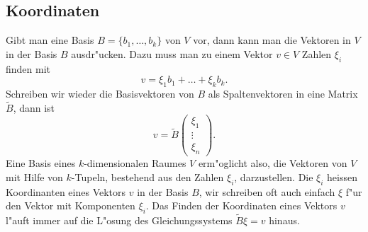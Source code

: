 \subsection{Koordinaten}
Gibt man eine Basis $B=\{b_1,\dots,b_k\}$ von $V$ vor,
dann kann man die Vektoren
in $V$ in der Basis $B$ ausdr"ucken. Dazu muss man zu einem 
Vektor $v\in V$ Zahlen $\xi_i$ finden mit
\[
v=\xi_1 b_1+\dots +\xi_k b_k.
\]
Schreiben wir wieder die Basisvektoren von $B$ als Spaltenvektoren in 
eine Matrix $\tilde B$, dann ist 
\[
v=\tilde B\begin{pmatrix}\xi_1\\\vdots\\\xi_n\end{pmatrix}.
\]
Eine Basis eines $k$-dimensionalen Raumes $V$ erm"oglicht also,
die Vektoren von $V$ mit Hilfe von $k$-Tupeln, bestehend
aus den Zahlen $\xi_i$, darzustellen. Die $\xi_i$ heissen
Koordinanten eines Vektors $v$ in der Basis $B$, wir schreiben
oft auch einfach $\xi$ f"ur den Vektor mit Komponenten $\xi_i$.
Das Finden der Koordinaten eines Vektors $v$ l"auft immer auf die L"osung
des Gleichungssystems $\tilde B\xi=v$ hinaus.

